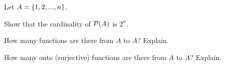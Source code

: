 \begin{problem}
  Let $A = \left\{1, 2, ..., n\right\}$.
  \begin{enumalph}
    \item Show that the cardinality of $\mathcal{P}(A)$ is $2^n$.
      \begin{answer}

      \end{answer}
    \item How many functions are there from $A$ to $A$? Explain.
      \begin{answer}

      \end{answer}
    \item How many onto (surjective) functions are there from $A$ to $A$? Explain.
      \begin{answer}

      \end{answer}
  \end{enumalph}
\end{problem}
